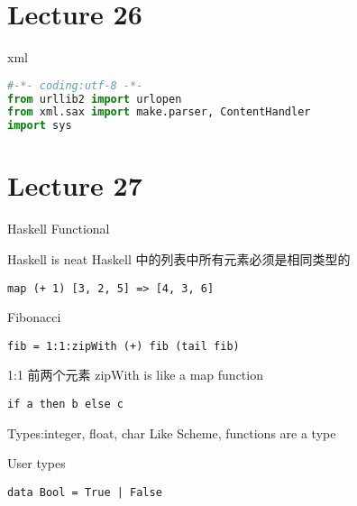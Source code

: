 \documentclass{article}
\begin{document}
\section{Lecture 26}
xml

\begin{lstlisting}[language = Python]
#-*- coding:utf-8 -*-
from urllib2 import urlopen
from xml.sax import make.parser, ContentHandler
import sys
\end{lstlisting}

\section{Lecture 27}
Haskell
Functional
 
Haskell is neat
Haskell 中的列表中所有元素必须是相同类型的
\begin{verbatim}
map (+ 1) [3, 2, 5] => [4, 3, 6]
\end{verbatim}

Fibonacci
\begin{verbatim}
fib = 1:1:zipWith (+) fib (tail fib)
\end{verbatim}
1:1 前两个元素
zipWith is like a map function

\begin{verbatim}
if a then b else c
\end{verbatim}

Types:integer, float, char
Like Scheme, functions are a type

User types
\begin{verbatim}
data Bool = True | False
\end{verbatim}
\end{document}
